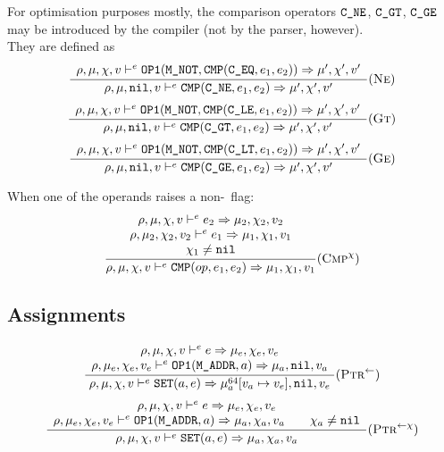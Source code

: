 For optimisation purposes mostly, the comparison operators \(\texttt{C\_NE}\), \(\texttt{C\_GT}\), \(\texttt{C\_GE}\) may be introduced by the compiler (not by the parser, however).\\
They are defined as
\[\dfrac{\begin{array}{c}
    \rho,\mu,\chi,v \vdash^e \texttt{OP1}(\texttt{M\_NOT}, \texttt{CMP}(\texttt{C\_EQ}, e_1, e_2)) \Rightarrow \mu',\chi',v'
\end{array}}{\rho,\mu,\texttt{nil},v \vdash^e \texttt{CMP}(\texttt{C\_NE}, e_1, e_2) \Rightarrow \mu',\chi',v'}(\textsc{Ne})\]
\[\dfrac{\begin{array}{c}
    \rho,\mu,\chi,v \vdash^e \texttt{OP1}(\texttt{M\_NOT}, \texttt{CMP}(\texttt{C\_LE}, e_1, e_2)) \Rightarrow \mu',\chi',v'
\end{array}}{\rho,\mu,\texttt{nil},v \vdash^e \texttt{CMP}(\texttt{C\_GT}, e_1, e_2) \Rightarrow \mu',\chi',v'}(\textsc{Gt})\]
\[\dfrac{\begin{array}{c}
    \rho,\mu,\chi,v \vdash^e \texttt{OP1}(\texttt{M\_NOT}, \texttt{CMP}(\texttt{C\_LT}, e_1, e_2)) \Rightarrow \mu',\chi',v'
\end{array}}{\rho,\mu,\texttt{nil},v \vdash^e \texttt{CMP}(\texttt{C\_GE}, e_1, e_2) \Rightarrow \mu',\chi',v'}(\textsc{Ge})\]

When one of the operands raises a non-\nil\ flag:
\[\dfrac{\begin{array}{c}
    \rho,\mu,\chi,v \vdash^e e_2\Rightarrow \mu_2,\chi_2,v_2 \\
    \rho,\mu_2,\chi_2,v_2 \vdash^e e_1\Rightarrow \mu_1,\chi_1,v_1 \\
    \chi_1\ne\texttt{nil}
\end{array}}{\rho,\mu,\chi,v \vdash^e \texttt{CMP}(op, e_1, e_2) \Rightarrow \mu_1,\chi_1,v_1} (\textsc{Cmp}^\chi)\]

\subsection{Assignments}

\[\dfrac{\begin{array}{c}
    \rho,\mu,\chi,v \vdash^e e \Rightarrow \mu_e,\chi_e,v_e \\
    \rho,\mu_e,\chi_e,v_e \vdash^e \texttt{OP1}(\texttt{M\_ADDR}, a) \Rightarrow \mu_a,\texttt{nil},v_a
\end{array}}{\rho,\mu,\chi,v \vdash^e \texttt{SET}(a, e) \Rightarrow \mu_a^{64}[v_a\mapsto v_e],\texttt{nil},v_e}(\textsc{Ptr}^\gets)\]
\[\dfrac{\begin{array}{c}
    \rho,\mu,\chi,v \vdash^e e \Rightarrow \mu_e,\chi_e,v_e \\
    \rho,\mu_e,\chi_e,v_e \vdash^e \texttt{OP1}(\texttt{M\_ADDR}, a) \Rightarrow \mu_a,\chi_a,v_a \qquad \chi_a\ne\texttt{nil}
\end{array}}{\rho,\mu,\chi,v \vdash^e \texttt{SET}(a, e) \Rightarrow \mu_a,\chi_a,v_a}(\textsc{Ptr}^{\gets\chi})\]

